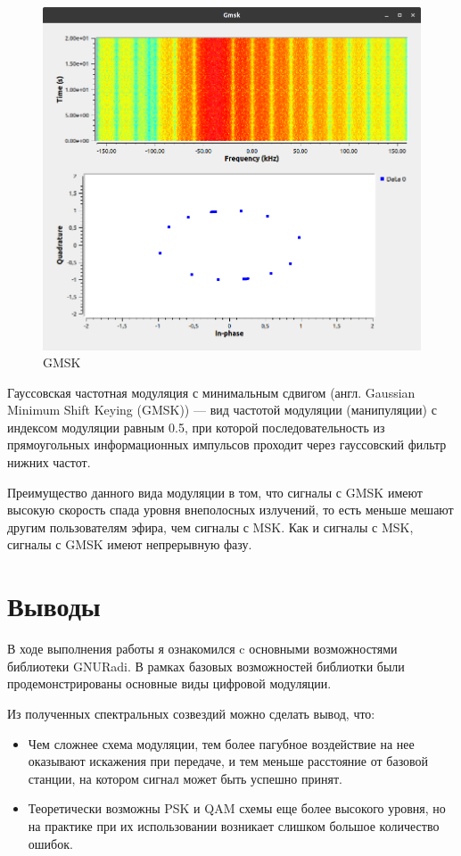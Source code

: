 \begin{figure}[H]
	\begin{center}
		\includegraphics[width=\linewidth]{pics/GMSK}
		\caption{GMSK}
		\label{fig:GMSK}
	\end{center}
\end{figure}

Гауссовская частотная модуляция с минимальным сдвигом (англ. Gaussian Minimum Shift Keying (GMSK)) — вид частотой модуляции (манипуляции) с индексом модуляции равным 0.5, при которой последовательность из прямоугольных информационных импульсов проходит через гауссовский фильтр нижних частот.

Преимущество данного вида модуляции в том, что сигналы с GMSK имеют высокую скорость спада уровня внеполосных излучений, то есть меньше мешают другим пользователям эфира, чем сигналы с MSK. Как и сигналы с MSK, сигналы с GMSK имеют непрерывную фазу.

\newpage
\section{Выводы}
В ходе выполнения работы я ознакомился c основными возможностями библиотеки GNURadi. В рамках базовых возможностей библиотки были продемонстрированы основные виды цифровой модуляции.

Из полученных спектральных созвездий можно сделать вывод, что: 
\begin{itemize}
	\item Чем сложнее схема модуляции, тем более пагубное воздействие на нее оказывают искажения при передаче, и тем меньше расстояние от базовой станции, на котором сигнал может быть успешно принят.
	
	\item Теоретически возможны PSK и QAM схемы еще более высокого уровня, но на практике при их использовании возникает слишком большое количество ошибок.
\end{itemize}



